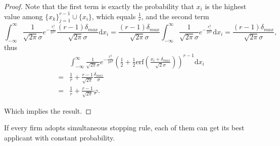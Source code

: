 \begin{proof}
    Note that the first term is exactly the probability that $x_i$ is the highest value among $\{x_k\}_{j=1}^{r-1} \cup \{x_i\}$, which equals $\frac{1}{r}$, and the second term
    \[\int_{-\infty}^{\infty} \frac{1}{\sqrt{2 \pi}\sigma} e^{-\frac{x_i^2}{2\sigma^2}}
        \frac{(r-1)\delta_{max}}{\sqrt{2\pi}\sigma}\mathrm{d} x_i
    = \frac{(r-1)\delta_{max}}{\sqrt{2\pi}\sigma}
    \int_{-\infty}^{\infty} \frac{1}{\sqrt{2 \pi}\sigma} e^{-\frac{x_i^2}{2\sigma^2}} \mathrm{d} x_i
    = \frac{(r-1)\delta_{max}}{\sqrt{2\pi}\sigma},\]
    thus
    \begin{align*}
    & \int_{-\infty}^{\infty} \frac{1}{\sqrt{2 \pi}\sigma} e^{-\frac{x_i^2}{2\sigma^2}}
        \left(\frac{1}{2} + \frac{1}{2}\mathrm{erf}\left(\frac{x_i + \delta_{max}}{\sqrt{2}\sigma}\right)\right)^{r-1} \mathrm{d} x_i \\
    = &\frac{1}{r} + \frac{r-1}{\sqrt{2\pi}} \frac{\delta_{max}}{\sigma} \\
    = &\frac{1}{r} + \frac{r - 1}{\sqrt{2\pi}} \varphi.
    \end{align*}
    
    Which implies the result.

\end{proof}

\begin{lemma} \label{cplem}
If every firm adopts simultaneous stopping rule, each of them can get
its best applicant with constant probability.
\end{lemma}

